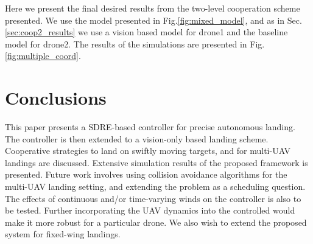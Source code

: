 \documentclass[conf]{new-aiaa}
\begin{document}
Here we present the final desired results from the two-level cooperation scheme presented. We use the model presented in Fig.\ref{fig:mixed_model}, and as in Sec.\ref{sec:coop2_results} we use a vision based model for drone1 and the baseline model for drone2. The results of the simulations are presented in Fig.\ref{fig:multiple_coord}.


\section{Conclusions}\label{sec:conclusions}
This paper presents a SDRE-based controller for precise autonomous landing. The controller is then extended to a vision-only based landing scheme. Cooperative strategies to land on swiftly moving targets, and for multi-UAV landings are discussed. Extensive simulation results of the proposed framework is presented. Future work involves using collision avoidance algorithms for the multi-UAV landing setting, and extending the problem as a scheduling question. The effects of continuous and/or time-varying winds on the controller is also to be tested. Further incorporating the UAV dynamics into the controlled would make it more robust for a particular drone. We also wish to extend the proposed system for fixed-wing landings.


\end{document}
